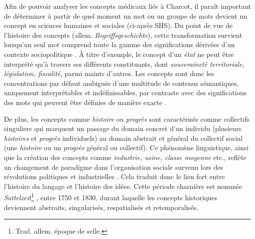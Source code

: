 Afin de pouvoir analyser les concepts médicaux liés à Charcot, il paraît important de déterminer à partir de quel moment un mot ou un groupe de mots devient un concept en sciences humaines et sociales (ci-après SHS). Du point de vue de l'histoire des concepts (allem. \textit{Begriffsgeschichte}), cette transformation survient lorsqu'un seul mot comprend toute la gamme des significations dérivées d'un contexte sociopolitique \citep[p. 258]{koselleck2011introduction}. À titre d'exemple, le concept d'un \textit{état} ne peut être interprété qu'à travers ses différents constituants, dont \textit{souveraineté territoriale, législation, fiscalité}, parmi maints d'autres. Les concepts sont donc les concentrations par défaut ambiguës d'une multitude de contenus sémantiques, uniquement interprétables et indéfinissables, par contraste avec des significations des mots qui peuvent être définies de manière exacte \citep[p. 20]{koselleck2011introduction}. 

De plus, les concepts comme \textit{histoire} ou \textit{progrès} sont caractérisés comme \og{}collectifs singuliers\fg{} qui marquent un passage du domain concret d'un individu (plusieurs \textit{histoires} et \textit{progrès} individuels) au domain abstrait et général du collectif social (une \textit{histoire} ou un \textit{progrès} général ou collectif). Ce phénomène linguistique, ainsi que la création des concepts comme \textit{industrie, usine, classe moyenne} etc., reflète un changement de paradigme dans l'organisation sociale survenu lors des révolutions politiques et industrielles \citep[p. 1]{hobsbawm2010age}. Cela traduit donc le lien fort entre l'histoire du langage et l'histoire des idées. 
Cette période charnière est nommée \textit{Sattelzeit}\footnote{Trad. allem. \og{}époque de selle\fg{}.} \citep[p.~8]{koselleck2011introduction}, entre 1750 et 1830, durant laquelle les concepts historiques deviennent abstraits, singularisés, respatialisés et retemporalisés.
 
